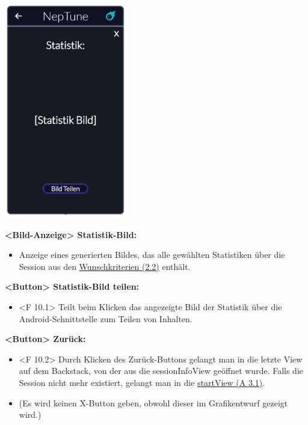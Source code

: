 \documentclass[oneside, ngerman]{sdqtechreport}
\begin{document}
\begin{center}
    \hypertarget{sessionStatsView}{}
    \includegraphics[width=0.4\textwidth]{LATEX/Pflichtenheft/GraphicDesigns/statisticsPopUpPage.png}
\end{center}

\textbf{<Bild-Anzeige> Statistik-Bild:}
\begin{itemize}
    \item Anzeige eines generierten Bildes, das alle gewählten Statistiken über die Session aus den \hyperlink{Wunschkriterien}{Wunschkriterien (2.2)} enthält.
\end{itemize}

\textbf{<Button> Statistik-Bild teilen:}
\begin{itemize}
    \hypertarget{<F 10.1>}{}
    \item <F 10.1> Teilt beim Klicken das angezeigte Bild der Statistik über die Android-Schnittstelle zum Teilen von Inhalten.
\end{itemize}

\textbf{<Button> Zurück:}
\begin{itemize}
    \hypertarget{<F 10.2>}{}
    \item <F 10.2> Durch Klicken des Zurück-Buttons gelangt man in die letzte View auf dem Backstack, von der aus die sessionInfoView geöffnet wurde. Falls die Session nicht mehr existiert, gelangt man in die \hyperlink{startView}{startView (A 3.1)}.
    \item (Es wird keinen X-Button geben, obwohl dieser im Grafikentwurf gezeigt wird.)
\end{itemize}
\end{document}
